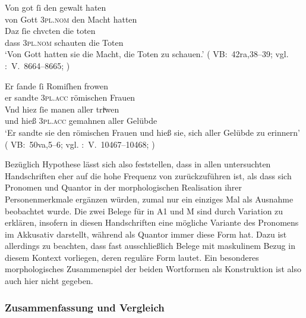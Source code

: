 \begin{exe}
\ex \label{ex:vbsisie}
 	\begin{xlist}
 	\ex \gll Von got ſi den gewalt haten \\
		     von Gott \textsc{3pl\subM.nom} den Macht hatten \\
 	\sn \gll Daz ſie chvcten die toten \\
		     dass \textsc{3pl\subM.nom} schauten die Toten \\
		\trans `Von Gott hatten sie  die Macht, die
			Toten zu schauen.'
			(%
				VB:~42ra,38--39; vgl.
				\KC:~V.~8664--8665;
				\cite[241]{schroeder1895}%
			)
 		\label{ex:vbsisie_1}

	\ex \gll Er ſande ſi Romiſhen frowen \\
		     er sandte \textsc{3pl\subI.acc} römischen Frauen \\
	\sn \gll Vnd hiez ſie manen aller triͮwen \\
		     und hieß \textsc{3pl\subF.acc} gemahnen aller Gelübde \\
		\trans `Er sandte sie  den römischen Frauen und
			hieß sie, sich aller Gelübde zu erinnern'
			(%
				VB:~50va,5--6; vgl.
				\KC:~V.~10467--10468;
				\cite[273]{schroeder1895}%
			)
		\label{ex:vbsisie_2}
	\end{xlist}%
\end{exe}

Bezüglich  Hypothese lässt sich also feststellen, dass
 in allen unter\-suchten Handschriften eher auf die hohe
Frequenz von  zurückzuführen ist, als dass sich
Pro\-nomen und Quantor in der morphologischen Realisation ihrer
Personenmerkmale ergänzen würden, zumal  nur ein einziges Mal
als Ausnahme beobachtet wurde. Die zwei Belege für  in A1 und M sind durch Variation zu erklären, insofern  in
diesen Handschriften eine mög\-liche Variante des Pronomens im Akkusativ
darstellt, während  als Quantor immer diese Form hat. Dazu ist
allerdings zu beachten, dass fast ausschließlich Belege mit maskulinem Bezug in
diesem Kontext vorliegen, deren reguläre Form  lautet. Ein
besonderes morphologisches Zusammenspiel der beiden Wortformen als Konstruktion
ist also auch hier nicht gegeben.

\subsubsection{Zusammenfassung und Vergleich}
\label{subsubsec:persfeatsmry}

